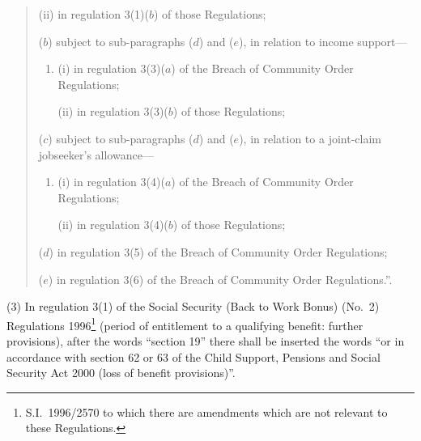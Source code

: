 \documentclass[12pt,a4paper]{article}
\begin{document}
\begin{enumerate}
\begin{quotation}
\begin{enumerate}
\begin{enumerate}
(ii) in regulation 3(1)($b$)  of those Regulations;
\end{enumerate}

($b$) subject to sub-paragraphs ($d$)  and ($e$), in relation to income support—
\begin{enumerate}\item[]
(i) in regulation 3(3)($a$)  of the Breach of Community Order Regulations;

(ii) in regulation 3(3)($b$)  of those Regulations;
\end{enumerate}

($c$) subject to sub-paragraphs ($d$)  and ($e$), in relation to a joint-claim jobseeker’s allowance—
\begin{enumerate}\item[]
(i) in regulation 3(4)($a$)  of the Breach of Community Order Regulations;

(ii) in regulation 3(4)($b$)  of those Regulations;
\end{enumerate}

($d$) in regulation 3(5) of the Breach of Community Order Regulations;

($e$) in regulation 3(6) of the Breach of Community Order Regulations.”.
\end{enumerate}
\end{quotation}
\end{enumerate}

(3) In regulation 3(1) of the Social Security (Back to Work Bonus) (No.\ 2) Regulations 1996\footnote{S.I.\ 1996/2570 to which there are amendments which are not relevant to these Regulations.} (period of entitlement to a qualifying benefit: further provisions), after the words “section 19” there shall be inserted the words “or in accordance with section 62 or 63 of the Child Support, Pensions and Social Security Act 2000 (loss of benefit provisions)”.
\end{document}
